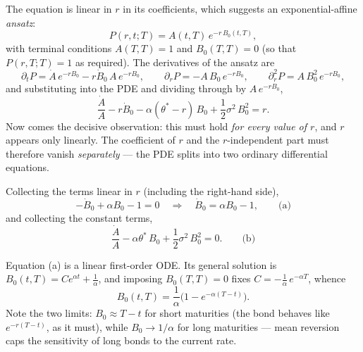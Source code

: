 The equation is linear in $r$ in its coefficients, which suggests an exponential-affine \emph{ansatz}:
\begin{equation}
P(r,t;T) = A(t,T)\, e^{-r\, B_0(t,T)},
\end{equation}
with terminal conditions $A(T,T) = 1$ and $B_0(T,T) = 0$ (so that $P(r,T;T)=1$ as required).
The derivatives of the ansatz are
\begin{equation}
\partial_t P = \dot{A}\, e^{-rB_0} - r\dot{B}_0\, A\, e^{-rB_0},
\qquad
\partial_r P = -A\,B_0\,e^{-rB_0}, \qquad \partial^2_r P = A\,B_0^2\,e^{-rB_0},
\end{equation}
and substituting into the PDE and dividing through by $A\, e^{-rB_0}$,
\begin{equation}
\frac{\dot{A}}{A} - r\dot{B}_0 - \alpha(\theta^*-r)\,B_0 + \frac{1}{2}\sigma^2\,B_0^2 = r.
\end{equation}
Now comes the decisive observation: this must hold \emph{for every value of $r$}, and $r$ appears only linearly.
The coefficient of $r$ and the $r$-independent part must therefore vanish \emph{separately} --- the PDE splits into two ordinary differential equations.

Collecting the terms linear in $r$ (including the right-hand side),
\begin{equation*}
-\dot{B}_0 + \alpha B_0 - 1 = 0 \quad\Longrightarrow\quad \dot{B}_0 = \alpha B_0 - 1,
\qquad\text{(a)}
\end{equation*}
and collecting the constant terms,
\begin{equation*}
\frac{\dot{A}}{A} - \alpha\theta^*\,B_0 + \frac{1}{2}\sigma^2\,B_0^2 = 0.
\qquad\text{(b)}
\end{equation*}

Equation (a) is a linear first-order ODE.
Its general solution is $B_0(t,T) = Ce^{\alpha t} + \frac{1}{\alpha}$, and imposing $B_0(T,T)=0$ fixes $C = -\frac{1}{\alpha}\,e^{-\alpha T}$, whence
\begin{equation}\label{eq:vasicek-B}
B_0(t,T) = \frac{1}{\alpha}\bigl(1 - e^{-\alpha(T-t)}\bigr).
\end{equation}
Note the two limits: $B_0\approx T-t$ for short maturities (the bond behaves like $e^{-r(T-t)}$, as it must), while $B_0\to1/\alpha$ for long maturities --- mean reversion caps the sensitivity of long bonds to the current rate.

